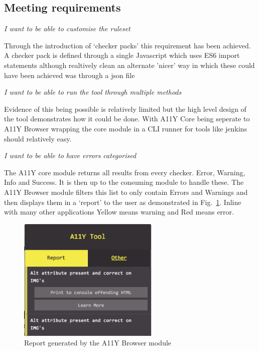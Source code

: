 \subsection{Meeting requirements}
\begin{center}
\textit{I want to be able to customise the ruleset}
\end{center}
Through the introduction of `checker packs' this requirement has been
achieved. A checker pack is defined through a single Javascript which uses
ES6 import statements although realtively clean an alternate 'nicer' way in
which these could have been achieved was through a json file

\begin{center}
\textit{I want to be able to run the tool through multiple methods}
\end{center}
Evidence of this being possible is relatively limited but the high level
design of the tool demonstrates how it could be done. With A11Y Core being
seperate to A11Y Browser wrapping the core module in a CLI runner for tools
like jenkins should relatively easy.

\begin{center}
\textit{I want to be able to have errors categorised}
\end{center}
The A11Y core module returns all results from every checker. Error, Warning,
Info and Success. It is then up to the consuming module to handle these. The
A11Y Browser module filters this list to only contain Errors and Warnings and
then displays them in a `report' to the user as demonstrated in
Fig.~\ref{fig:a11y_tool_report}. Inline with many other applications Yellow
means warning and Red means error.

\begin{figure}[H]
\centering
\includegraphics[width=0.6\textwidth]{figures/a11y_tool_report}
\captionsetup{justification=centering}
\caption{Report generated by the A11Y Browser module
\label{fig:a11y_tool_report}}
\end{figure}

